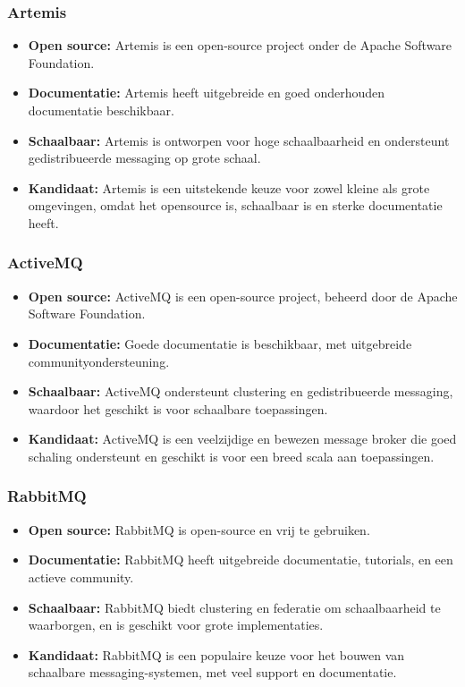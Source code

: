 \subsubsection{Artemis}
\begin{itemize}
    \item \textbf{Open source:} Artemis is een open-source project onder de Apache Software Foundation.
    \item \textbf{Documentatie:} Artemis heeft uitgebreide en goed onderhouden documentatie beschikbaar.
    \item \textbf{Schaalbaar:} Artemis is ontworpen voor hoge schaalbaarheid en ondersteunt gedistribueerde messaging op grote schaal.
    \item \textbf{Kandidaat:} Artemis is een uitstekende keuze voor zowel kleine als grote omgevingen, omdat het opensource is, schaalbaar is en sterke documentatie heeft.
\end{itemize}

\subsubsection{ActiveMQ}
\begin{itemize}
    \item \textbf{Open source:} ActiveMQ is een open-source project, beheerd door de Apache Software Foundation.
    \item \textbf{Documentatie:} Goede documentatie is beschikbaar, met uitgebreide communityondersteuning.
    \item \textbf{Schaalbaar:} ActiveMQ ondersteunt clustering en gedistribueerde messaging, waardoor het geschikt is voor schaalbare toepassingen.
    \item \textbf{Kandidaat:} ActiveMQ is een veelzijdige en bewezen message broker die goed schaling ondersteunt en geschikt is voor een breed scala aan toepassingen.
\end{itemize}

\subsubsection{RabbitMQ}
\begin{itemize}
    \item \textbf{Open source:} RabbitMQ is open-source en vrij te gebruiken.
    \item \textbf{Documentatie:} RabbitMQ heeft uitgebreide documentatie, tutorials, en een actieve community.
    \item \textbf{Schaalbaar:} RabbitMQ biedt clustering en federatie om schaalbaarheid te waarborgen, en is geschikt voor grote implementaties.
    \item \textbf{Kandidaat:} RabbitMQ is een populaire keuze voor het bouwen van schaalbare messaging-systemen, met veel support en documentatie.
\end{itemize}

